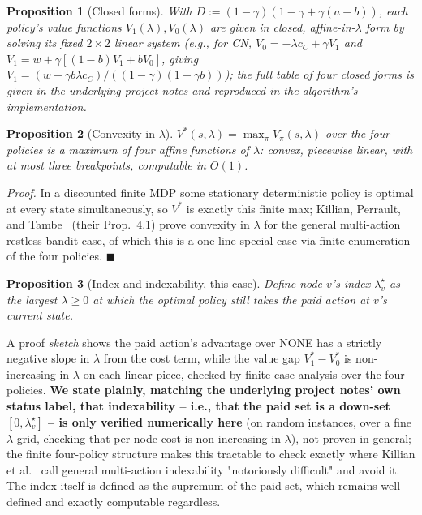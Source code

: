 \documentclass[journal]{IEEEtran}
\newtheorem{proposition}{Proposition}
\newcommand{\eqdef}{:=}
\begin{document}
\begin{proposition}[Closed forms]
\label{prop:closedform}
With $D\eqdef(1-\gamma)(1-\gamma+\gamma(a+b))$, each policy's value
functions $V_1(\lambda), V_0(\lambda)$ are given in closed, affine-in-$\lambda$
form by solving its fixed $2\times2$ linear system (e.g., for CN,
$V_0=-\lambda c_C+\gamma V_1$ and $V_1=w+\gamma[(1-b)V_1+bV_0]$, giving
$V_1=(w-\gamma b\lambda c_C)/((1-\gamma)(1+\gamma b))$); the full table of
four closed forms is given in the underlying project notes and reproduced
in the algorithm's implementation.
\end{proposition}

\begin{proposition}[Convexity in $\lambda$]
\label{prop:convexity}
$V^*(s,\lambda)=\max_\pi V_\pi(s,\lambda)$ over the four policies is a
maximum of four affine functions of $\lambda$: convex, piecewise linear,
with at most three breakpoints, computable in $O(1)$.
\end{proposition}
\emph{Proof.} In a discounted finite MDP some stationary deterministic
policy is optimal at every state simultaneously, so $V^*$ is exactly this
finite max; Killian, Perrault, and Tambe~\cite{killian2021beyond} (their
Prop.\ 4.1) prove convexity in $\lambda$ for the general multi-action
restless-bandit case, of which this is a one-line special case via finite
enumeration of the four policies. $\blacksquare$

\begin{proposition}[Index and indexability, this case]
\label{prop:indexability}
Define node $v$'s index $\lambda^\star_v$ as the largest $\lambda\ge0$ at
which the optimal policy still takes the paid action at $v$'s current state.
\end{proposition}
A proof \emph{sketch} shows the paid action's advantage over NONE has a
strictly negative slope in $\lambda$ from the cost term, while the value
gap $V^*_1-V^*_0$ is non-increasing in $\lambda$ on each linear piece,
checked by finite case analysis over the four policies. \textbf{We state
plainly, matching the underlying project notes' own status label, that
indexability -- i.e., that the paid set is a down-set $[0,\lambda^\star_v]$
-- is only verified numerically here} (on random instances, over a fine
$\lambda$ grid, checking that per-node cost is non-increasing in
$\lambda$), not proven in general; the finite four-policy structure makes
this tractable to check exactly where Killian et
al.~\cite{killian2021beyond} call general multi-action indexability
"notoriously difficult" and avoid it. The index itself is defined as the
supremum of the paid set, which remains well-defined and exactly computable
regardless.
\end{document}

